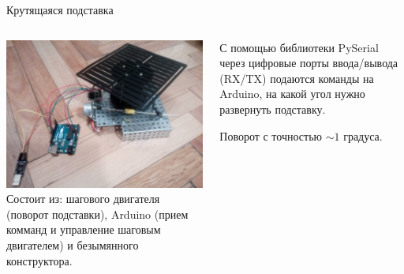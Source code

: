 \documentclass{beamer}
\begin{document}
\begin{frame}{Крутящаяся подставка}
    \begin{columns}[T]
        \begin{column}[T]{5cm}
            \includegraphics[scale=0.04]{device}\\
            \small
            Состоит из:
            шагового двигателя (поворот подставки),
            Arduino (прием комманд и управление шаговым двигателем) 
            и безымянного конструктора.
        \end{column}
        \begin{column}[T]{5cm}
            С помощью библиотеки PySerial через цифровые порты ввода/вывода (RX/TX) подаются команды на Arduino, на какой угол нужно развернуть подставку.
            \vspace*{2\baselineskip}

            Поворот с точностью $\sim 1$ градуса.
        \end{column}
    \end{columns}
\end{frame}
\end{document}
